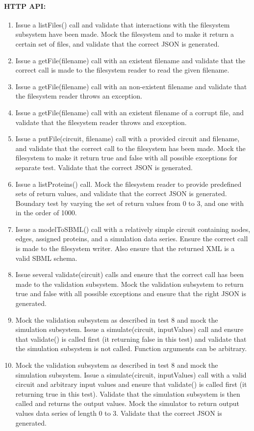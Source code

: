 \paragraph{HTTP API:
}\begin{enumerate}
\item Issue a listFiles() call and validate that interactions with the filesystem subsystem have been made. Mock the filesystem and to make it return a certain set of files, and validate that the correct JSON is generated.
\item Issue a getFile(filename) call with an existent filename and validate that the correct call is made to the filesystem reader to read the given filename.
\item Issue a getFile(filename) call with an non-existent filename and validate that the filesystem reader throws an exception.
\item Issue a getFile(filename) call with an existent filename of a corrupt file, and validate that the filesystem reader throws and exception.
\item Issue a putFile(circuit, filename) call with a provided circuit and filename, and validate  that the correct call to the filesystem has been made. Mock the filesystem to make it return true and false with all possible exceptions for separate test. Validate that the correct JSON is generated.\item Issue a listProteins() call. Mock the filesystem reader to provide predefined sets of return values, and validate that the correct JSON is generated. Boundary test by varying the set of return values from 0 to 3, and one with in the order of 1000. \item Issue a modelToSBML() call with a relatively simple circuit containing nodes, edges, assigned proteins, and a simulation data series. Ensure the correct call is made to the filesystem writer. Also ensure that the returned XML is a valid SBML schema.\item Issue several validate(circuit) calls and ensure that the correct call has been made to the validation subsystem. Mock the validation subsystem to return true and false with all possible exceptions and ensure that the right JSON is generated.
\item Mock the validation subsystem as described in test 8 and mock the simulation subsystem. Issue a simulate(circuit, inputValues) call and ensure that validate() is called first (it returning false in this test) and validate that the simulation subsystem is not called. Function arguments can be arbitrary. 
\item Mock the validation subsystem as described in test 8 and mock the simulation subsystem. Issue a simulate(circuit, inputValues) call with a valid circuit and arbitrary input values and ensure that validate() is called first (it returning true in this test). Validate that the simulation subsystem is then called and returns the output values. Mock the simulator to return output values data series of length 0 to 3. Validate that the correct JSON is generated.\end{enumerate}
